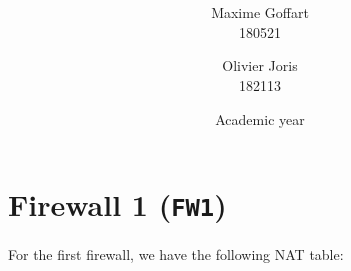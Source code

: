 \documentclass[a4paper, 11pt, oneside]{article}
\title{\ClassName\\\vspace*{0.8cm}\ProjectName\vspace{1cm}}
\author{Maxime Goffart \\180521 \and Olivier Joris\\182113}
\date{\vspace{1cm}Academic year \AcademicYear}
\begin{document}

\begin{titlingpage}
{\let\newpage\relax\maketitle}
\end{titlingpage}

\newpage


\section{Firewall 1 (\texttt{FW1})}
\paragraph{}For the first firewall, we have the following NAT table:
\end{document}
